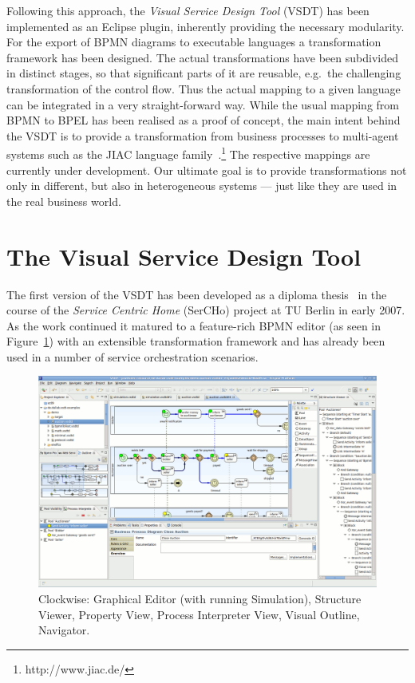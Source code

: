 Following this approach, the \emph{Visual Service Design Tool} (VSDT) has been
implemented as an Eclipse plugin, inherently providing the necessary modularity.
For the export of BPMN diagrams to executable languages a transformation framework
has been designed.  The actual transformations have been subdivided in distinct
stages, so that significant parts of it are reusable, e.g.\ the challenging
transformation of the control flow.  Thus the actual mapping to a given language
can be integrated in a very straight-forward way.  While the usual mapping from
BPMN to BPEL has been realised as a proof of concept, the main intent behind the
VSDT is to provide a transformation from business processes to multi-agent systems
such as the JIAC language family~\cite{Hirsch2009Multi-Agent}.\footnote{http://www.jiac.de/}
The respective mappings are currently under development.  Our ultimate goal is to
provide transformations not only in different, but also in heterogeneous systems
--- just like they are used in the real business world.



\section{The Visual Service Design Tool}
\label{sec:intro_vsdt}

The first version of the VSDT has been developed as a diploma
thesis~\cite{kuester2007development} in the course of the \emph{Service Centric
Home} (SerCHo) project at TU Berlin in early 2007.  As the work continued it
matured to a feature-rich BPMN editor (as seen in Figure~\ref{fig:screen}) with
an extensible transformation framework and has already been used in a number of
service orchestration scenarios.

\begin{figure}
	\centering
	\includegraphics[height=.4\textheight]{figures/vsdt_1-3-0.png}
	\caption{Clockwise: Graphical Editor (with running Simulation), Structure
	Viewer, Property View, Process Interpreter View, Visual Outline, Navigator.}
	\label{fig:screen}
\end{figure}


